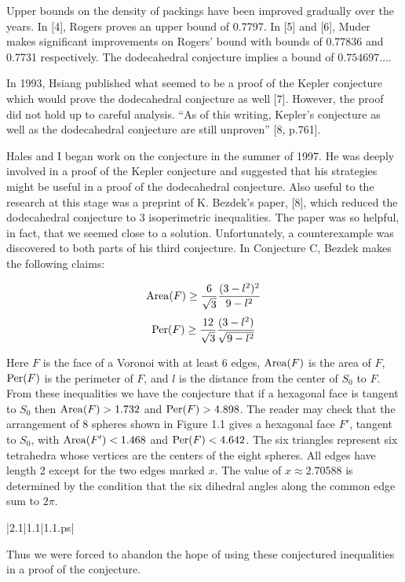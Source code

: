 Upper bounds on the density of packings have been improved gradually
over the years.  In [4], Rogers proves an upper bound of 0.7797.  In [5] and [6], 
Muder makes significant improvements on Rogers' bound with bounds of 
0.77836 and 0.7731 respectively.  The dodecahedral conjecture 
implies a bound of $0.754697\dots$.


In 1993, Hsiang published what seemed to be a proof of the Kepler conjecture which would prove the 
dodecahedral conjecture as well [7].  However, the proof did not hold up to
 careful analysis.  ``As of this writing, Kepler's conjecture as well as the 
dodecahedral conjecture are still unproven'' [8, p.761].

Hales and I began work on the conjecture in the summer of 1997.  He was deeply 
involved in a proof of the Kepler conjecture and suggested that his strategies 
might be useful in a proof of the dodecahedral conjecture.  Also useful to the 
research at this stage was a preprint of K. Bezdek's paper, [8], which reduced 
the dodecahedral conjecture to 3 isoperimetric inequalities.  The paper was so helpful,
 in fact, that we seemed close to a solution.  Unfortunately, a counterexample 
was discovered to both parts of his third conjecture.  In Conjecture C, 
Bezdek makes the following claims:


$$\operatorname{Area}(F)\ge \frac 6 {\sqrt3} \frac {(3-l^2)^2}{9-l^2}$$
$$\operatorname{Per}(F)\ge\frac {12} {\sqrt3} \frac {(3-l^2)}{\sqrt{9-l^2}}$$

Here $F$ is the face of a Voronoi with at least 6 edges, $\operatorname{Area}(F)$ 
is the area of $F$, $\operatorname{Per}(F)$ is the perimeter of $F$, and $l$ is the distance 
from the center of $S_0$ to $F$.  From these inequalities we have the conjecture
 that if a hexagonal face is tangent to $S_0$ then $\operatorname{Area}(F) > 1.732$ and 
$\operatorname{Per}(F)>4.898$.  The reader may check that the arrangement of 8 spheres shown 
in Figure 1.1 gives a hexagonal face $F'$, tangent to $S_0$, with $\operatorname{Area}(F')<1.468$
 and $\operatorname{Per}(F)<4.642$.  
The six triangles represent six tetrahedra whose vertices
are the centers of the eight spheres.  
All edges have length 2 except for the two edges marked $x$.  
The value of $x\approx 2.70588$ 
is determined by the condition that the six dihedral
angles along the common edge sum to $2\pi$.
	
\gram|2.1|1.1|1.1.ps|  %


Thus we were forced to abandon the hope of using these conjectured inequalities 
in a proof of the conjecture.
	
